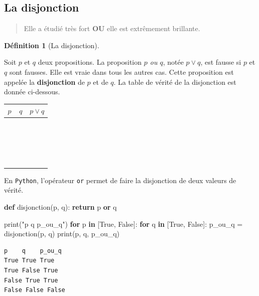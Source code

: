\documentclass[
  letterpaper,
]{scrbook}
\newenvironment{Shaded}{\begin{snugshade}}{\end{snugshade}}
\newcommand{\BuiltInTok}[1]{\textcolor[rgb]{0.00,0.50,0.00}{#1}}
\newcommand{\ControlFlowTok}[1]{\textcolor[rgb]{0.00,0.44,0.13}{\textbf{#1}}}
\newcommand{\KeywordTok}[1]{\textcolor[rgb]{0.00,0.44,0.13}{\textbf{#1}}}
\newcommand{\NormalTok}[1]{\textcolor[rgb]{0.00,0.44,0.13}{#1}}
\newcommand{\OperatorTok}[1]{\textcolor[rgb]{0.40,0.40,0.40}{#1}}
\newcommand{\StringTok}[1]{\textcolor[rgb]{0.25,0.44,0.63}{#1}}
\newcommand{\VariableTok}[1]{\textcolor[rgb]{0.10,0.09,0.49}{#1}}
\theoremstyle{plain}
\theoremstyle{definition}
\newtheorem{definition}{Définition}[chapter]
\theoremstyle{definition}
\theoremstyle{remark}
\begin{document}
\hypertarget{la-disjonction}{%
\subsection{La disjonction}\label{la-disjonction}}

\begin{quote}
Elle a étudié très fort \textbf{OU} elle est extrêmement brillante.
\end{quote}

\begin{definition}[La
disjonction]\protect\hypertarget{def-disjonction}{}\label{def-disjonction}

Soit \(p\) et \(q\) deux propositions. La proposition \emph{\(p\) ou
\(q\)}, notée \(p\vee q\), est fausse si \(p\) et \(q\) sont fausses.
Elle est vraie dans tous les autres cas. Cette proposition est appelée
la \textbf{disjonction} de \(p\) et de \(q\). La table de vérité de la
disjonction est donnée ci-dessous.

\begin{longtable}[]{@{}ccc@{}}
\toprule\noalign{}
\(p\) & \(q\) & \(p \vee q\) \\
\midrule\noalign{}
\endhead
\bottomrule\noalign{}
\endlastfoot
\(\phantom{V}\) & \(\phantom{V}\) & \(\phantom{V}\) \\
\(\phantom{V}\) & \(\phantom{V}\) & \(\phantom{V}\) \\
\(\phantom{V}\) & \(\phantom{V}\) & \(\phantom{V}\) \\
\(\phantom{V}\) & \(\phantom{V}\) & \(\phantom{V}\) \\
\end{longtable}

En \texttt{Python}, l'opérateur \texttt{or} permet de faire la
disjonction de deux valeurs de vérité.

\hypertarget{disjonction-python}{}
\begin{Shaded}
\begin{Highlighting}[]
\KeywordTok{def}\NormalTok{ disjonction(p, q):}
    \ControlFlowTok{return}\NormalTok{ p }\KeywordTok{or}\NormalTok{ q}

\BuiltInTok{print}\NormalTok{(}\StringTok{"p    q    p\_ou\_q"}\NormalTok{)}
\ControlFlowTok{for}\NormalTok{ p }\KeywordTok{in}\NormalTok{ [}\VariableTok{True}\NormalTok{, }\VariableTok{False}\NormalTok{]:}
    \ControlFlowTok{for}\NormalTok{ q }\KeywordTok{in}\NormalTok{ [}\VariableTok{True}\NormalTok{, }\VariableTok{False}\NormalTok{]:}
\NormalTok{        p\_ou\_q }\OperatorTok{=}\NormalTok{ disjonction(p, q)}
        \BuiltInTok{print}\NormalTok{(p, q, p\_ou\_q)}
\end{Highlighting}
\end{Shaded}

\begin{verbatim}
p    q    p_ou_q
True True True
True False True
False True True
False False False
\end{verbatim}

\end{definition}
\end{document}

